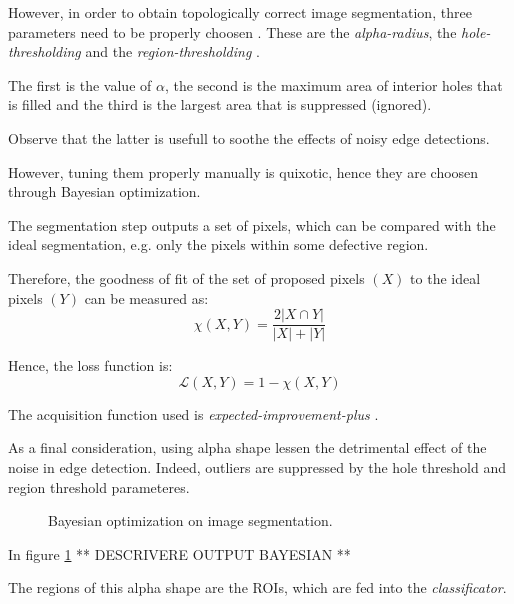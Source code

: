         \par{
            However, in order to obtain topologically correct image segmentation, three parameters need to be properly choosen \cite{springer:10.1007/11907350_46}. These are the \emph{alpha-radius}, the \emph{hole-thresholding} and the \emph{region-thresholding} \cite{matlab:alpha-shape}.
        }
        \par{
            The first is the value of $\alpha$, the second is the maximum area of interior holes that is filled and the third is the largest area that is suppressed (ignored).
        }
        \par{
            Observe that the latter is usefull to soothe the effects of noisy edge detections.
        }
        \par{
            However, tuning them properly manually is quixotic, hence they are choosen through Bayesian optimization.
        }
        \par{
            The segmentation step outputs a set of pixels, which can be compared with the ideal segmentation, e.g. only the pixels within some defective region.
        }
        \par{
            Therefore, the goodness of fit of the set of proposed pixels $\left(X\right)$ to the ideal pixels $\left(Y\right)$ can be measured as:
            \begin{equation*}
                \chi\left(X, Y\right) = \frac{2 \lvert X \cap Y \rvert}{\lvert X \rvert + \lvert Y \rvert}
            \end{equation*}
        }
        \par{
            Hence, the loss function is:
            \begin{equation*}
                \mathcal{L}\left(X, Y\right) = 1 - \chi\left(X, Y\right)
            \end{equation*}
        }
        \par{
            The acquisition function used is \emph{expected-improvement-plus} \cite{matlab:acquisition}.
        }
        \par{
            As a final consideration, using alpha shape lessen the detrimental effect of the noise in edge detection. Indeed, outliers are suppressed by the hole threshold and region threshold parameteres.
        }
        \begin{figure}
            \caption{Bayesian optimization on image segmentation.}\label{fig:image-segmentation-optimization}
        \end{figure}
        \par{
            In figure \ref{fig:image-segmentation-optimization} ** DESCRIVERE OUTPUT BAYESIAN **
        }
        \par{
            The regions of this alpha shape are the ROIs, which are fed into the \emph{classificator}.
        }
